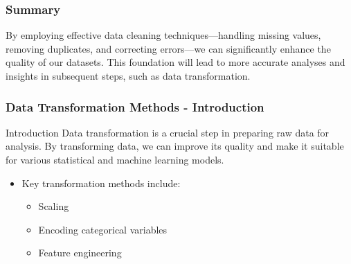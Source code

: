 \documentclass[aspectratio=169]{beamer}
\begin{document}
\begin{frame}
    \frametitle{Summary}
    By employing effective data cleaning techniques—handling missing values, removing duplicates, and correcting errors—we can significantly enhance the quality of our datasets. This foundation will lead to more accurate analyses and insights in subsequent steps, such as data transformation.
\end{frame}

\begin{frame}[fragile]
    \frametitle{Data Transformation Methods - Introduction}
    \begin{block}{Introduction}
        Data transformation is a crucial step in preparing raw data for analysis. By transforming data, we can improve its quality and make it suitable for various statistical and machine learning models.
    \end{block}
    \begin{itemize}
        \item Key transformation methods include:
        \begin{itemize}
            \item Scaling
            \item Encoding categorical variables
            \item Feature engineering
        \end{itemize}
    \end{itemize}
\end{frame}
\end{document}
